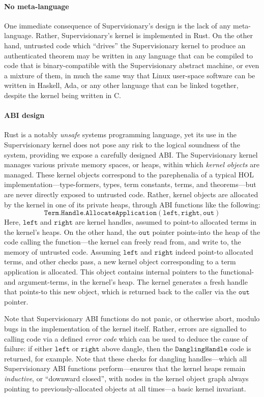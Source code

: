 \documentclass[sigplan, review]{acmart}
\begin{document}
\paragraph{No meta-language} One immediate consequence of Supervisionary's design is the lack of any meta-language.
Rather, Supervisionary's kernel is implemented in Rust.
On the other hand, untrusted code which ``drives'' the Supervisionary kernel to produce an authenticated theorem may be written in any language that can be compiled to code that is binary-compatible with the Supervisionary abstract machine, or even a mixture of them, in much the same way that Linux user-space software can be written in Haskell, Ada, or any other language that can be linked together, despite the kernel being written in C.

\paragraph{ABI design} Rust is a notably \emph{unsafe} systems programming language, yet its use in the Supervisionary kernel does not pose any risk to the logical soundness of the system, providing we expose a carefully designed ABI.
The Supervisionary kernel manages various private memory spaces, or heaps, within which \emph{kernel objects} are managed.
These kernel objects correspond to the parephenalia of a typical HOL implementation---type-formers, types, term constants, terms, and theorems---but are never directly exposed to untrusted code.
Rather, kernel objects are allocated by the kernel in one of its private heaps, through ABI functions like the following:
\begin{displaymath}
\mathtt{Term.Handle.AllocateApplication(left, right, out)}
\end{displaymath}
Here, $\mathtt{left}$ and $\mathtt{right}$ are kernel handles, assumed to point-to allocated terms in the kernel's heaps.
On the other hand, the $\mathtt{out}$ pointer points-into the heap of the code calling the function---the kernel can freely read from, and write to, the memory of untrusted code.
Assuming $\mathtt{left}$ and $\mathtt{right}$ indeed point-to allocated terms, and other checks pass, a new kernel object corresponding to a term application is allocated.
This object contains internal pointers to the functional- and argument-terms, in the kernel's heap.
The kernel generates a fresh handle that points-to this new object, which is returned back to the caller via the $\mathtt{out}$ pointer.

Note that Supervisionary ABI functions do not panic, or otherwise abort, modulo bugs in the implementation of the kernel itself.
Rather, errors are signalled to calling code via a defined \emph{error code} which can be used to deduce the cause of failure: if either $\mathtt{left}$ or $\mathtt{right}$ above dangle, then the $\mathtt{DanglingHandle}$ code is returned, for example.
Note that these checks for dangling handles---which all Supervisionary ABI functions perform---ensures that the kernel heaps remain \emph{inductive}, or ``downward closed'', with nodes in the kernel object graph always pointing to previously-allocated objects at all times---a basic kernel invariant.
\end{document}
